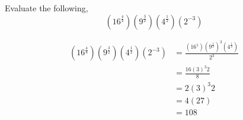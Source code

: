 \documentclass[12pt]{article} %
\begin{document}
\begin{qstn}
  Evaluate the following,
\[
      \left( 16^{\frac{4}{4}} \right) \left( 9^{\frac{3}{2}} \right) \left( 4^{\frac{1}{2}} \right) \left( 2^{-3}
      \right)
\] 

  \begin{solution}
    \begin{align*}
      \left( 16^{\frac{4}{4}} \right) \left( 9^{\frac{3}{2}} \right) \left( 4^{\frac{1}{2}} \right) \left( 2^{-3}
      \right)
      &= \frac{\left( 16^{1} \right) \left( 9^{\frac{1}{2}} \right) ^{3}\left( 4^{\frac{1}{2}} \right)}{2^{3}}\\
      &= \frac{16 \left( 3 \right) ^{3}2}{8}\\
      &= 2 \left( 3 \right) ^{3}2\\
      &= 4(27)\\
      &= 108
    \end{align*}
  \end{solution}
  
\end{qstn}
\end{document}
